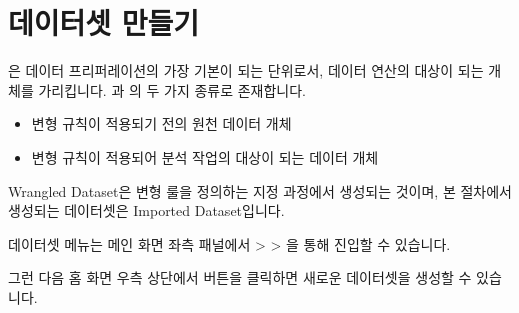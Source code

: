 \documentclass[letterpaper,10pt,english]{sphinxmanual}
\begin{document}
\section{데이터셋 만들기}
\label{\detokenize{discovery/part07/create_a_dataset:id1}}\label{\detokenize{discovery/part07/create_a_dataset::doc}}
은 데이터 프리퍼레이션의 가장 기본이 되는 단위로서, 데이터 연산의 대상이 되는 개체를 가리킵니다. 과 의 두 가지 종류로 존재합니다.
\begin{itemize}
\item {} 
 변형 규칙이 적용되기 전의 원천 데이터 개체

\item {} 
 변형 규칙이 적용되어 분석 작업의 대상이 되는 데이터 개체

\end{itemize}

Wrangled Dataset은 변형 룰을 정의하는  지정 과정에서 생성되는 것이며, 본 절차에서 생성되는 데이터셋은 Imported Dataset입니다.

데이터셋 메뉴는 메인 화면 좌측 패널에서  \textgreater{}  \textgreater{} 을 통해 진입할 수 있습니다.
\begin{quote}

\begin{figure}[H]
\centering

\noindent{}
\end{figure}
\end{quote}

그런 다음  홈 화면 우측 상단에서  버튼을 클릭하면 새로운 데이터셋을 생성할 수 있습니다.
\begin{quote}

\begin{figure}[H]
\centering

\noindent{}
\end{figure}
\end{quote}
\end{document}
